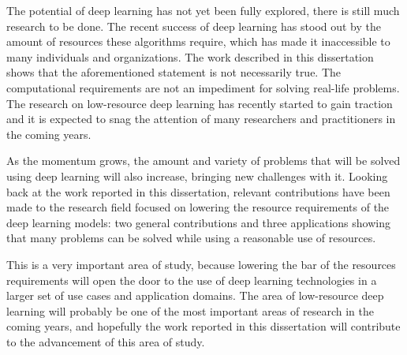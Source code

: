 The potential of deep learning has not yet been fully explored, there is still much research to be done. The recent success of deep learning has stood out by the amount of resources these algorithms require, which has made it inaccessible to many individuals and organizations. The work described in this dissertation shows that the aforementioned statement is not necessarily true. The computational requirements are not an impediment for solving real-life problems. The research on low-resource deep learning has recently started to gain traction and it is expected to snag the attention of many researchers and practitioners in the coming years. 

As the momentum grows, the amount and variety of problems that will be solved using deep learning will also increase, bringing new challenges with it. Looking back at the work reported in this dissertation, relevant contributions have been made to the research field focused on lowering the resource requirements of the deep learning models: two general contributions and three applications showing that many problems can be solved while using a reasonable use of resources. 

This is a very important area of study, because lowering the bar of the resources requirements will open the door to the use of deep learning technologies in a larger set of use cases and application domains.  The area of low-resource deep learning will probably be one of the most important areas of research in the coming years, and hopefully the work reported in this dissertation will contribute to the advancement of this area of study.

